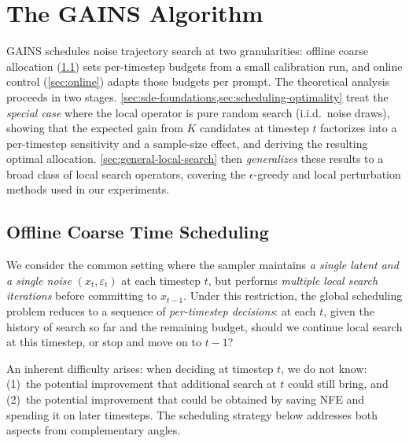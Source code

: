 \section{The GAINS Algorithm}
\label{sec:algorithm}

GAINS schedules noise trajectory search at two granularities:
offline coarse allocation (\cref{sec:offline}) sets per-timestep budgets from
a small calibration run, and online control (\cref{sec:online}) adapts those
budgets per prompt.
The theoretical analysis proceeds in two stages.
\cref{sec:sde-foundations,sec:scheduling-optimality} treat the
\emph{special case} where the local operator is pure random search
(i.i.d.\ noise draws), showing that the expected gain from $K$ candidates
at timestep $t$ factorizes into a per-timestep sensitivity and a
sample-size effect, and deriving the resulting optimal allocation.
\cref{sec:general-local-search} then \emph{generalizes} these results
to a broad class of local search operators, covering the $\epsilon$-greedy
and local perturbation methods used in our experiments.

\subsection{Offline Coarse Time Scheduling}
\label{sec:offline}

We consider the common setting where the sampler maintains \emph{a single latent and a single noise}
$(x_t, \varepsilon_t)$ at each timestep $t$, but performs \emph{multiple local search
iterations} before committing to $x_{t-1}$.
Under this restriction, the global scheduling problem reduces to a sequence of
\emph{per-timestep decisions}: at each $t$, given the history of search so far
and the remaining budget, should we continue local search at this timestep,
or stop and move on to $t-1$?

An inherent difficulty arises: when deciding at timestep $t$, we do not know:
(1)~the potential improvement that additional search at $t$ could still bring,
and (2)~the potential improvement that could be obtained by saving NFE and
spending it on later timesteps.
The scheduling strategy below addresses both aspects from complementary
angles.

